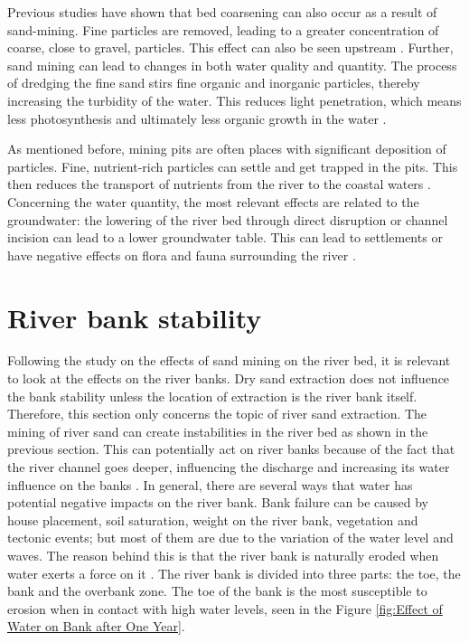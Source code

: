 Previous studies have shown that bed coarsening can also occur as a result of sand-mining. Fine particles are removed, leading to a greater concentration of coarse, close to gravel, particles. This effect can also be seen upstream \autocite{sand-mining-boek}. Further, sand mining can lead to changes in both water quality and quantity. The process of dredging the fine sand stirs fine organic and inorganic particles, thereby increasing the turbidity of the water. This reduces light penetration, which means less photosynthesis and ultimately less organic growth in the water \autocite{sharipEffectsSeasonSand2014}.

As mentioned before, mining pits are often places with significant deposition of particles. Fine, nutrient-rich particles can settle and get trapped in the pits. This then reduces the transport of nutrients from the river to the coastal waters \autocite{sand-mining-boek}. Concerning the water quantity, the most relevant effects are related to the groundwater: the lowering of the river bed through direct disruption or channel incision can lead to a lower groundwater table. This can lead to settlements or have negative effects on flora and fauna surrounding the river \autocite{rentierEnvironmentalImpactsRiver2022}.

\section{River bank stability}
Following the study on the effects of sand mining on the river bed, it is relevant to look at the effects on the river banks. Dry sand extraction does not influence the bank stability unless the location of extraction is the river bank itself. Therefore, this section only concerns the topic of river sand extraction.
The mining of river sand can create instabilities in the river bed as shown in the previous section. This can potentially act on river banks because of the fact that the river channel goes deeper, influencing the discharge and increasing its water influence on the banks \autocite{hackneyRiverBankInstability2020}. In general, there are several ways that water has potential negative impacts on the river bank. Bank failure can be caused by house placement, soil saturation, weight on the river bank, vegetation and tectonic events; but most of them are due to the variation of the water level and waves. The reason behind this is that the river bank is naturally eroded when water exerts a force on it \autocite{governmentofsouthaustraliaRiverbankCollapse2024}.
The river bank is divided into three parts: the toe, the bank and the overbank zone. The toe of the bank is the most susceptible to erosion when in contact with high water levels, seen in the Figure \ref{fig:Effect of Water on Bank after One Year}.

